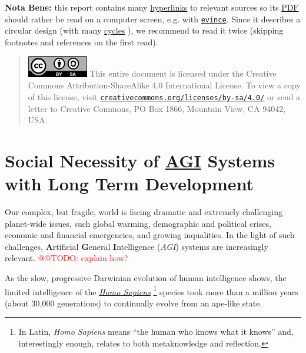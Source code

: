 \documentclass[11pt,a4paper,svgnames]{article}
\begin{document}
\begin{titlepage}
  \medskip
  \textbf{Nota Bene:} this report contains many
  \href{https://en.wikipedia.org/wiki/Hyperlink}{hyperlinks} to
  relevant sources so its
  \href{https://en.wikipedia.org/wiki/PDF}{PDF} should rather be read
  on a computer screen, e.g. with
  \href{https://en.wikipedia.org/wiki/Evince}{\texttt{evince}}. Since
  it describes a circular design (with many
  \href{https://en.wikipedia.org/wiki/Cycle_graph}{cycles}
  \cite{Hofstadter:1979:GEB}), we recommend to read it twice (skipping
  footnotes and references on the first read).

  \bigskip


  \begin{quote}
  \begin{relsize}{-1}
  \includegraphics[width=75pt]{CC-BY-SA-icon} This entire document is
  licensed under the Creative Commons Attribution-ShareAlike 4.0
  International License. To view a copy of this license, visit
  \href{http://creativecommons.org/licenses/by-sa/4.0/}{\texttt{creativecommons.org/licenses/by-sa/4.0/}}
  or send a letter to Creative Commons, PO Box 1866, Mountain View, CA
  94042, USA.
  \end{relsize}
  \end{quote}
  
\end{titlepage}



\tableofcontents

\bigskip


\section{Social Necessity of \href{https://en.wikipedia.org/wiki/Artificial_general_intelligence}{AGI} Systems with  Long Term Development}
\label{sec:social}

Our complex, but fragile, world is facing dramatic and extremely challenging
planet-wide issues, such global warming, demographic and political crises,
economic and financial emergencies, and growing inqualities. In the light of
such challenges, \textbf{A}rtificial \textbf{G}eneral \textbf{I}ntelligence
(\emph{AGI}) systems are increasingly relevant. \textcolor{red}{@@TODO: explain
how?}

As the slow, progressive Darwinian evolution  of human intelligence shows, the
limited intelligence of the 
\emph{\href{https://en.wikipedia.org/wiki/Homo_sapiens}{Homo Sapiens}}
\footnote{In Latin, \emph{Homo Sapiens} means ``the human who knows what it
knows'' and, interestingly enough, relates to both \gls{metaknowledge} and
\gls{reflection}.} species took more than a million years (about 30,000 
generations) to continually evolve from an ape-like state.
\end{document}
